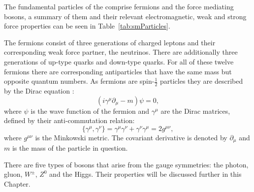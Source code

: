 The fundamental particles of the \SM comprise fermions and the force
mediating bosons, a summary of them and their relevant
electromagnetic, weak and strong force properties can be seen in
Table~\ref{tab:smParticles}. 

The fermions consist of three generations of charged leptons and their
corresponding weak force partner, the neutrinos. There are
additionally three generations of up-type quarks and down-type quarks. For all
of these twelve fermions there are corresponding antiparticles that
have the same mass but opposite quantum numbers. As fermions are
spin-$\frac{1}{2}$ particles they are described by the Dirac equation
\cite{Griffiths:111880}:
\begin{equation}
(i\gamma^{\mu}\partial_{\mu}-m)\psi=0,
\end{equation}
where $\psi$ is the wave function of the fermion and $\gamma^{\mu}$
are the Dirac matrices, defined by their anti-commutation relation:
\begin{equation}
\{\gamma^{\mu},\gamma^{\nu}\}=\gamma^{\mu}\gamma^{\nu}+\gamma^{\nu}\gamma^{\mu}=2g^{\mu\nu},
\end{equation}
where $g^{\mu\nu}$ is the Minkowski metric. The covariant derivative is denoted
by $\partial_{\mu}$ and $m$ is the mass of the particle in question.

There are five types of bosons that arise from the \SM gauge
symmetries: the photon, gluon, $W^{\pm}$, $Z^0$ and the Higgs. Their
properties will be discussed further in this Chapter.

